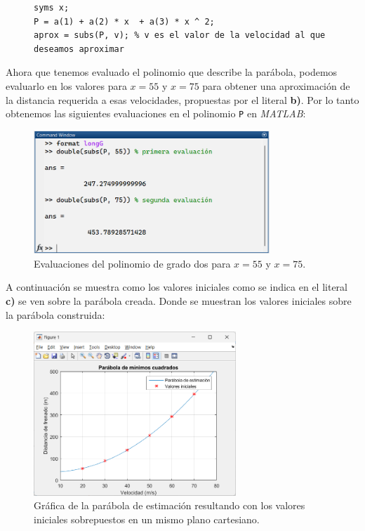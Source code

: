 \documentclass[11pt,letterpaper]{article}
\begin{document}
\begin{figure}[H]
\begin{tcolorbox}[title=Problema 4: Implementación en MATLAB]
\begin{verbatim}
syms x;
P = a(1) + a(2) * x  + a(3) * x ^ 2;
aprox = subs(P, v); % v es el valor de la velocidad al que deseamos aproximar
\end{verbatim}
\end{tcolorbox}
\end{figure}
Ahora que tenemos evaluado el polinomio que describe la parábola, podemos evaluarlo en los valores para $x=55$ y $x=75$ para obtener una aproximación de la distancia requerida a esas velocidades, propuestas por el literal \textbf{b)}. Por lo tanto obtenemos las siguientes evaluaciones en el polinomio \texttt{P} en \textit{MATLAB}:
\begin{figure}[H]
\centering
\includegraphics[width=3.5in]{res4.png}
\caption{Evaluaciones del polinomio de grado dos para $x=55$ y $x=75$.}
\label{figure:res4}
\end{figure}
A continuación se muestra como los valores iniciales como se indica en el literal \textbf{c)} se ven sobre la parábola creada. Donde se muestran los valores iniciales sobre la parábola construida:
\begin{figure}[H]
\centering
\includegraphics[width=3in]{parab4.png}
\caption{Gráfica de la parábola de estimación resultando con los valores iniciales sobrepuestos en un mismo plano cartesiano.}
\label{figure:parab4}
\end{figure}
\end{document}
